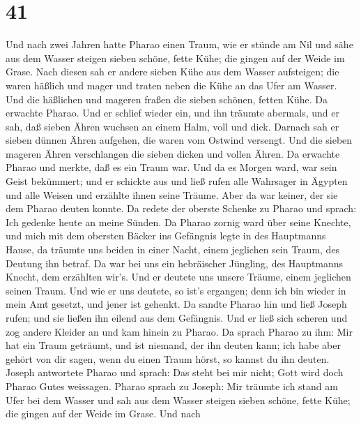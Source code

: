 \hypertarget{section-40}{%
\section{41}\label{section-40}}

 Und nach zwei Jahren hatte Pharao einen Traum, wie er
stünde am Nil  und sähe aus dem Wasser steigen sieben
schöne, fette Kühe; die gingen auf der Weide im Grase.  Nach
diesen sah er andere sieben Kühe aus dem Wasser aufsteigen; die waren
häßlich und mager und traten neben die Kühe an das Ufer am Wasser.
 Und die häßlichen und mageren fraßen die sieben schönen,
fetten Kühe. Da erwachte Pharao.  Und er schlief wieder ein,
und ihn träumte abermals, und er sah, daß sieben Ähren wuchsen an einem
Halm, voll und dick.  Darnach sah er sieben dünnen Ähren
aufgehen, die waren vom Ostwind versengt.  Und die sieben
mageren Ähren verschlangen die sieben dicken und vollen Ähren. Da
erwachte Pharao und merkte, daß es ein Traum war.  Und da es
Morgen ward, war sein Geist bekümmert; und er schickte aus und ließ
rufen alle Wahrsager in Ägypten und alle Weisen und erzählte ihnen seine
Träume. Aber da war keiner, der sie dem Pharao deuten konnte.
 Da redete der oberste Schenke zu Pharao und sprach: Ich
gedenke heute an meine Sünden.  Da Pharao zornig ward über
seine Knechte, und mich mit dem obersten Bäcker ins Gefängnis legte in
des Hauptmanns Hause,  da träumte uns beiden in einer
Nacht, einem jeglichen sein Traum, des Deutung ihn betraf. 
Da war bei uns ein hebräischer Jüngling, des Hauptmanns Knecht, dem
erzählten wir's. Und er deutete uns unsere Träume, einem jeglichen
seinen Traum.  Und wie er uns deutete, so ist's ergangen;
denn ich bin wieder in mein Amt gesetzt, und jener ist gehenkt.
 Da sandte Pharao hin und ließ Joseph rufen; und sie ließen
ihn eilend aus dem Gefängnis. Und er ließ sich scheren und zog andere
Kleider an und kam hinein zu Pharao.  Da sprach Pharao zu
ihm: Mir hat ein Traum geträumt, und ist niemand, der ihn deuten kann;
ich habe aber gehört von dir sagen, wenn du einen Traum hörst, so kannst
du ihn deuten.  Joseph antwortete Pharao und sprach: Das
steht bei mir nicht; Gott wird doch Pharao Gutes weissagen.
 Pharao sprach zu Joseph: Mir träumte ich stand am Ufer bei
dem Wasser  und sah aus dem Wasser steigen sieben schöne,
fette Kühe; die gingen auf der Weide im Grase.  Und nach
